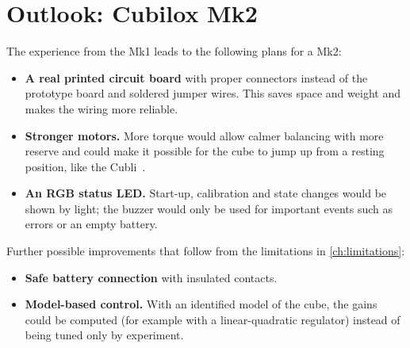 \chapter{Outlook: Cubilox Mk2}
\label{ch:outlook}

The experience from the Mk1 leads to the following plans for a Mk2:

\begin{itemize}
  \item \textbf{A real printed circuit board} with proper connectors instead of the prototype board
        and soldered jumper wires. This saves space and weight and makes the wiring more reliable.
  \item \textbf{Stronger motors.} More torque would allow calmer balancing with more reserve and
        could make it possible for the cube to jump up from a resting position, like the
        Cubli~\cite{gajamohan2012cubli}.
  \item \textbf{An RGB status LED.} Start-up, calibration and state changes would be shown by light;
        the buzzer would only be used for important events such as errors or an empty battery.
\end{itemize}

Further possible improvements that follow from the limitations in \cref{ch:limitations}:
\begin{itemize}
  \item \textbf{Safe battery connection} with insulated contacts.
  \item \textbf{Model-based control.} With an identified model of the cube, the gains could be
        computed (for example with a linear-quadratic regulator) instead of being tuned only by
        experiment.
\end{itemize}
